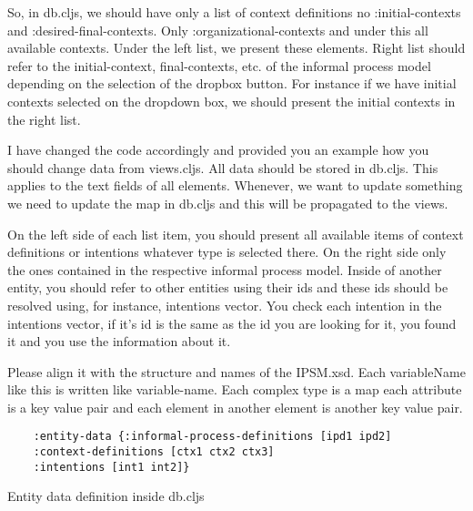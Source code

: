 So, in db.cljs, we should have only a list of context definitions no :initial-contexts and :desired-final-contexts. Only :organizational-contexts and under this all available contexts. Under the left list, we present these elements. Right list should refer to the initial-context, final-contexts, etc. of the informal process model depending on the selection of the dropbox button. For instance if we have initial contexts selected on the dropdown box, we should present the initial contexts in the right list.

I have changed the code accordingly and provided you an example how you should change data from views.cljs. All data should be stored in db.cljs. This applies to the text fields of all elements. Whenever, we want to update something we need to update the map in db.cljs and this will be propagated to the views.


On the left side of each list item, you should present all available items of context definitions or intentions whatever type is selected there. On the right side only the ones contained in the respective informal process model. Inside of another entity, you should refer to other entities using their ids and these ids should be resolved using, for instance, intentions vector. You check each intention in the intentions vector, if it’s id is the same as the id you are looking for it, you found it and you use the information about it.  


Please align it with the structure and names of the IPSM.xsd. Each variableName like this is written like variable-name. Each complex type is a map each attribute is a key value pair and each element in another element is another key value pair.

\begin{Listing}
	\begin{lstlisting}
	:entity-data {:informal-process-definitions [ipd1 ipd2]
	:context-definitions [ctx1 ctx2 ctx3]
	:intentions [int1 int2]} 
	\end{lstlisting}
	\caption{Entity data definition inside db.cljs}
	\label{lst:entitydatalist}
\end{Listing}





